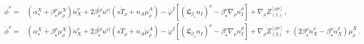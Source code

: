 \documentclass[a4paper, amsfonts, amssymb, amsmath, reprint, showkeys, nofootinbib, twoside,notitlepage,onecolumn]{revtex4-2}
\theoremstyle{definition}
\theoremstyle{theorem}
\theoremstyle{corollary}
\begin{document}
\begin{equation}\label{thphidot}
\begin{split}
\dot{\phi}^\nu={}& (\alpha_\star^X{+}\beta_\star^\rho \mu^X_\rho) \dot{n}^\nu_X +2 \beta^{[\rho}_\star u^{\nu]}(s\dot{T}_\rho {+}n_A \dot{\mu}^A_\rho) -\dot{\varphi}^I[(\mathfrak{L}_{\beta_\star} n_I)^\nu{-}\beta_\star^\nu \nabla_\rho n_I^\rho ] +\nabla_\rho {Z}_{(1)}^{[\rho \nu]} \, , \\
\ddot{\phi}^\nu={}& (\alpha_\star^X{+}\beta_\star^\rho \mu^X_\rho) \ddot{n}^\nu_X +2 \beta^{[\rho}_\star u^{\nu]}(s\ddot{T}_\rho {+}n_A \ddot{\mu}^A_\rho) -\ddot{\varphi}^I[(\mathfrak{L}_{\beta_\star} n_I)^\nu{-}\beta_\star^\nu \nabla_\rho n_I^\rho ]+ \nabla_\rho {Z}_{(2)}^{[\rho \nu]} + (2\beta^{\rho}_\star \dot{n}^{\nu}_X{-}\beta^{\nu}_\star \dot{n}^{\rho}_X) \dot{\mu}_\rho^X  \, . \\
\end{split}
\end{equation}
\end{document}
